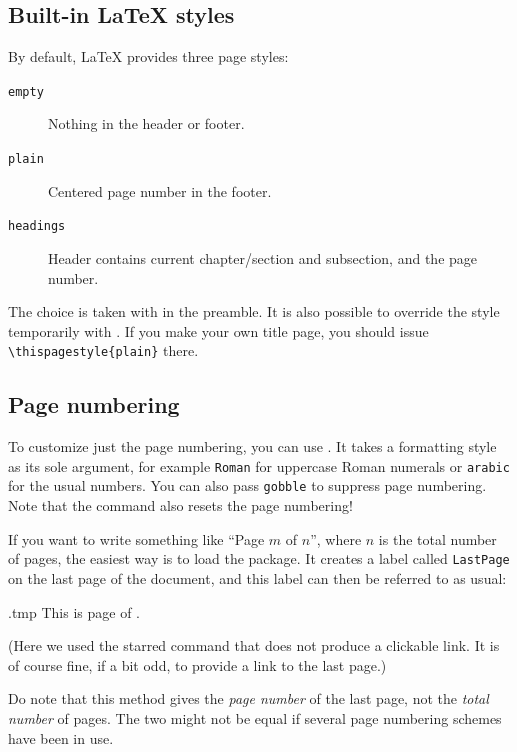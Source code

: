 \subsection{Built-in \LaTeX{} styles}

By default, \LaTeX{} provides three page styles:
%
\begin{description}
\item[\texttt{empty}] Nothing in the header or footer.
\item[\texttt{plain}] Centered page number in the footer.
\item[\texttt{headings}] Header contains current chapter/section and subsection, and the page number.
\end{description}
%
The choice is taken with  in the preamble.
It is also possible to override the style temporarily with .
If you make your own title page, you should issue \verb|\thispagestyle{plain}| there.



%
%
\subsection{Page numbering}

To customize just the page numbering, you can use .
It takes a formatting style as its sole argument, for example \verb|Roman|
for uppercase Roman numerals or \verb|arabic| for the usual numbers.
You can also pass \verb|gobble| to suppress page numbering.
Note that the command also resets the page numbering!

If you want to write something like ``Page $m$ of $n$'', where $n$ is the total number of pages,
the easiest way is to load the  package.
It creates a label called \verb|LastPage| on the last page of the document,
and this label can then be referred to as usual:
%
\begin{VerbatimOut}{\jobname.tmp}
This is page
\thepage{} of \pageref*{LastPage}.
\end{VerbatimOut}
\ShowExample
%
(Here we used the starred  command that does not produce a clickable link.
It is of course fine, if a bit odd, to provide a link to the last page.)

Do note that this method gives the \emph{page number} of the last page,
not the \emph{total number} of pages.
The two might not be equal if several page numbering schemes have been in use.


